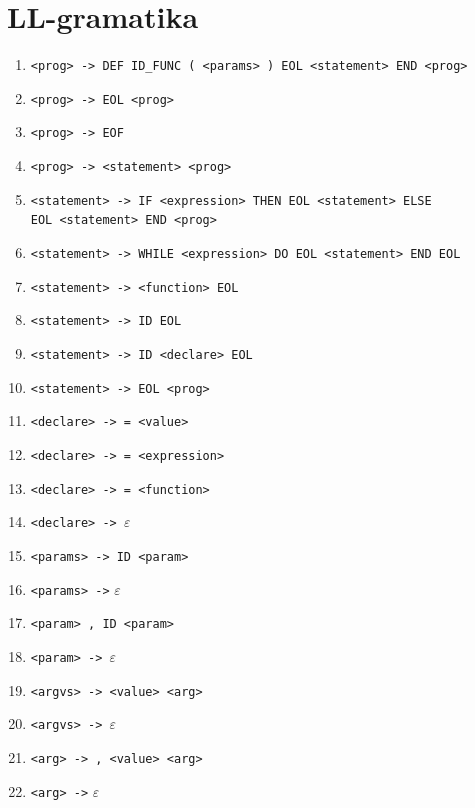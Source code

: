 \documentclass [11pt, a4paper]{article}
\begin{document}
\section{LL-gramatika}
\begin{table}[H]
	\centering
    \begin{enumerate}[noitemsep]
        \item \verb|<prog> -> DEF ID_FUNC ( <params> ) EOL <statement> END <prog>|
        \item \verb|<prog> -> EOL <prog>|
        \item \verb|<prog> -> EOF|
        \item \verb|<prog> -> <statement> <prog>|
        
        \item \verb|<statement> -> IF <expression> THEN EOL <statement> ELSE| \\ 
\verb|EOL <statement> END <prog>|
        \item \verb|<statement> -> WHILE <expression> DO EOL <statement> END EOL|
        \item \verb|<statement> -> <function> EOL|
        \item \verb|<statement> -> ID EOL|
        \item \verb|<statement> -> ID <declare> EOL|
        \item \verb|<statement> -> EOL <prog>|
        
        \item \verb|<declare> -> = <value>|
        \item \verb|<declare> -> = <expression>|
        \item \verb|<declare> -> = <function>|
        \item \verb|<declare> -> |$\varepsilon$
        
        \item \verb|<params> -> ID <param>|
        \item \verb|<params> ->| $\varepsilon$
        
        \item \verb|<param> , ID <param>|
        \item \verb|<param> -> |$\varepsilon$
    
        \item \verb|<argvs> -> <value> <arg>|
        \item \verb|<argvs> -> |$\varepsilon$
        
        \item \verb|<arg> -> , <value> <arg>|
        \item \verb|<arg> ->| $\varepsilon$
        

\end{enumerate}
\end{table}
\end{document}

